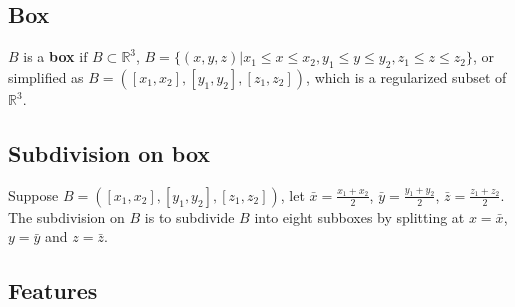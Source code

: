 \documentclass[twoside]{article}
\begin{document}
\begin{multicols}{2}
\subsection {Box}
            	$B$ is a \textbf{box} $\mathrm{if}$ $B \subset \mathbb{R}^3$, $B=\{ (x,y,z)|x_1\le x\le x_2, y_1\le y\le y_2, z_1\le z\le z_2\}$, or simplified as $B=([x_1,x_2],[y_1,y_2],[z_1,z_2])$, which is a regularized subset of $\mathbb{R}^3$.
            	\iffalse
        \\
		\\
		\indent Another representation of $B$ is $B=([x_1,x_2],[y_1,y_2],[z_1,z_2])$.
		\\
        \\
        
		\indent We name the set containing all boxes as $\mathbb{B}$.
		\fi
		
\subsection {Subdivision on box}
Suppose $B=([x_1,x_2],[y_1,y_2],[z_1,z_2])$, let $\bar{x} = \frac {x_1+x_2}{2}$, $\bar{y} = \frac {y_1+y_2}{2}$, $\bar{z} = \frac {z_1+z_2}{2}$. The subdivision on $B$ is to subdivide $B$ into eight subboxes by splitting at $x = \bar{x}$, $y = \bar{y}$ and $z = \bar{z}$.

\iffalse
\begin{itemize}
	\item $B_0=([x_1,\bar{x}],[y_1,\bar{y}],[z_1,\bar{z}])$
	\item $B_1=([x_1,\bar{x}],[y_1,\bar{y}],[\bar{z},z_2])$
	\item $B_2=([x_1,\bar{x}],[\bar{y},y_2],[z_1,\bar{z}])$
	\item $B_3=([x_1,\bar{x}],[\bar{y},y_2],[\bar{z},z_2])$
	\item $B_4=([\bar{x},x_2],[y_1,\bar{y}],[z_1,\bar{z}])$
	\item $B_5=([\bar{x},x_2],[y_1,\bar{y}],[\bar{z},z_2])$
	\item $B_6=([\bar{x},x_2],[\bar{y},y_2],[z_1,\bar{z}])$
	\item $B_7=([\bar{x},x_2],[\bar{y},y_2],[\bar{z},z_2])$
\end{itemize}	
\fi
	
\subsection {Features}


\end{multicols}
\end{document}
